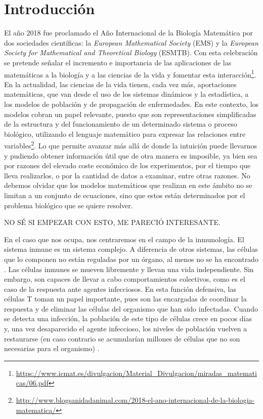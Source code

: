 \chapter{Introducción}
\label{cap:introduccion}


El año 2018 fue proclamado el Año Internacional de la Biología Matemática por dos sociedades científicas: la \textit{European Mathematical Society} (EMS) y la \textit{European Society for Mathematical and Theoretical Biology} (ESMTB). Con esta celebración se pretende señalar el incremento e importancia de las aplicaciones de las matemáticas a la biología y a las ciencias de la vida y fomentar esta interacción\footnote{\url{https://www.icmat.es/divulgacion/Material_Divulgacion/miradas_matematicas/06.pdf}}. En la actualidad, las ciencias de la vida tienen, cada vez más, aportaciones matemáticas, que van desde el uso de los sistemas dinámicos y la estadística, a los modelos de población y de propagación de enfermedades. En este contexto, los modelos cobran un papel relevante, puesto que son representaciones simplificadas de la estructura y del funcionamiento de un determinado sistema o proceso biológico, utilizando el lenguaje matemático para expresar las relaciones entre variables\footnote{\url{http://www.blogsanidadanimal.com/2018-el-ano-internacional-de-la-biologia-matematica/}}. Lo que permite avanzar más allá de donde la intuición puede llevarnos y pudiendo obtener información útil que de otra manera es imposible, ya bien sea por razones del elevado coste económico de los experimentos, por el tiempo que lleva realizarlos, o por la cantidad de datos a examinar, entre otras razones. No debemos olvidar que los modelos matemáticos que realizan en este ámbito no se limitan a un conjunto de ecuaciones, sino que estos están determinados por el problema biológico que se quiere resolver.

NO SÉ SI EMPEZAR CON ESTO, ME PARECIÓ INTERESANTE.

En el caso que nos ocupa, nos centraremos en el campo de la inmunología. El sistema inmune es un sistema complejo. A diferencia de otros sistemas, las células que lo componen no están reguladas por un órgano, al menos no se ha encontrado \citep{arias2016emergent}. Las células inmunes se mueven libremente y llevan una vida independiente. Sin embargo, son capaces de llevar a cabo comportamientos colectivos, como es el caso de la respuesta ante agentes infecciosos. En esta función defensiva, las células T toman un papel importante, pues son las encargadas de coordinar la respuesta y de eliminar las células del organismo que han sido infectadas. Cuando se detecta una infección, la población de este tipo de células crece en pocos días y, una vez desaparecido el agente infeccioso, los niveles de población vuelven a restaurarse (en caso contrario se acumularían millones de células que no son necesarias para el organismo) \citep{fernandez2012mecanica}.

